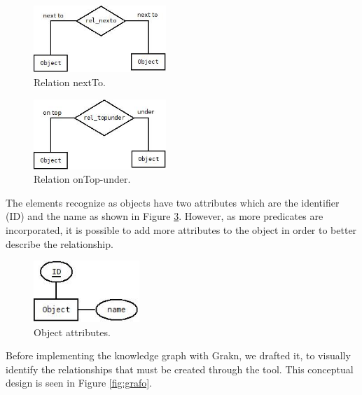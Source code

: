 \begin{figure}[H]
    \centering
    \includegraphics[width=5cm]{figures/nextto.jpg}
    \caption{Relation nextTo.}
    \label{fig:nexto}
\end{figure}

\begin{figure}[H]
    \centering
    \includegraphics[width=5cm]{figures/topunder.jpg}
    \caption{Relation onTop-under.}
    \label{fig:topUnder}
\end{figure}

The elements recognize as objects have two attributes which are the identifier 
(ID) and the name as shown in Figure \ref{fig:object}. However, as more 
predicates are incorporated, it is possible to add more attributes to the 
object in order to better describe the relationship.


\begin{figure}[H]
    \centering
    \includegraphics[width=4cm]{figures/object.jpg}
    \caption{Object attributes.}
    \label{fig:object}
\end{figure}

Before implementing the knowledge graph with Grakn, we drafted it, 
to visually identify the relationships that must be created through 
the tool. This conceptual design is seen in Figure \ref{fig:grafo}.


